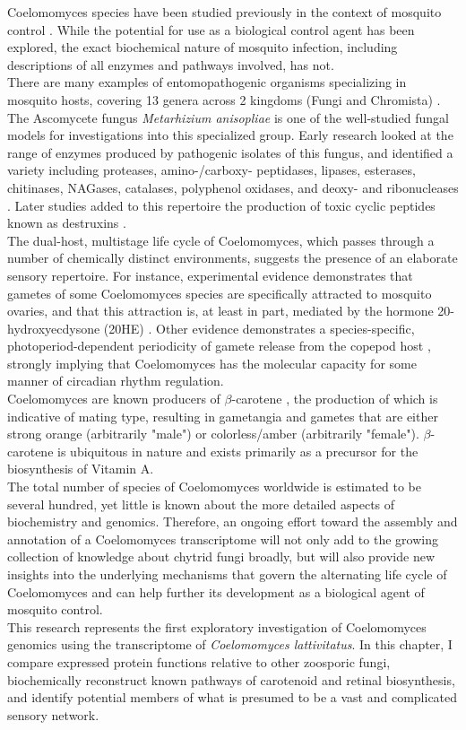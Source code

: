 \indent Coelomomyces species have been studied previously in the context of mosquito control \cite{Scholte2004}. While the potential for use as a biological control agent has been explored, the exact biochemical nature of mosquito infection, including descriptions of all enzymes and pathways involved, has not. \\
\indent There are many examples of entomopathogenic organisms specializing in mosquito hosts, covering 13 genera across 2 kingdoms (Fungi and Chromista) \cite{Scholte2004}. The Ascomycete fungus \textit{Metarhizium anisopliae} is one of the well-studied fungal models for investigations into this specialized group. Early research looked at the range of enzymes produced by pathogenic isolates of this fungus, and identified a variety including proteases, amino-/carboxy- peptidases, lipases, esterases, chitinases, NAGases, catalases, polyphenol oxidases, and deoxy- and ribonucleases \cite{(StLeger1986}. Later studies added to this repertoire the production of toxic cyclic peptides known as destruxins \cite{Wang2012}. \\ 
\indent The dual-host, multistage life cycle of Coelomomyces, which passes through a number of chemically distinct environments, suggests the presence of an elaborate sensory repertoire. For instance, experimental evidence demonstrates that gametes of some Coelomomyces species are specifically attracted to mosquito ovaries, and that this attraction is, at least in part, mediated by the hormone 20-hydroxyecdysone (20HE) \cite{Lucarotti1992}. Other evidence demonstrates a species-specific, photoperiod-dependent periodicity of gamete release from the copepod host \cite{Federici1983}, strongly implying that Coelomomyces has the molecular capacity for some manner of circadian rhythm regulation. \\
\indent Coelomomyces are known producers of $\beta$-carotene \cite{Federici1979}, the production of which is indicative of mating type, resulting in gametangia and gametes that are either strong orange (arbitrarily "male") or colorless/amber (arbitrarily "female"). $\beta$-carotene is ubiquitous in nature and exists primarily as a precursor for the biosynthesis of Vitamin A.\\
\indent The total number of species of Coelomomyces worldwide is estimated to be several hundred, yet little is known about the more detailed aspects of biochemistry and genomics. Therefore, an ongoing effort toward the assembly and annotation of a Coelomomyces transcriptome will not only add to the growing collection of knowledge about chytrid fungi broadly, but will also provide new insights into the underlying mechanisms that govern the alternating life cycle of Coelomomyces and can help further its development as a biological agent of mosquito control. \\
\indent This research represents the first exploratory investigation of Coelomomyces genomics using the transcriptome of \textit{Coelomomyces lattivitatus}. In this chapter, I compare expressed protein functions relative to other zoosporic fungi, biochemically reconstruct known pathways of carotenoid and retinal biosynthesis, and identify potential members of what is presumed to be a vast and complicated sensory network. \\
